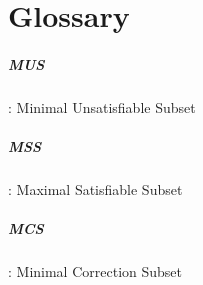 
\chapter{Glossary} %

\label{AppendixA} %


\paragraph{MUS}: Minimal Unsatisfiable Subset
\paragraph{MSS}: Maximal Satisfiable Subset
\paragraph{MCS}: Minimal Correction Subset